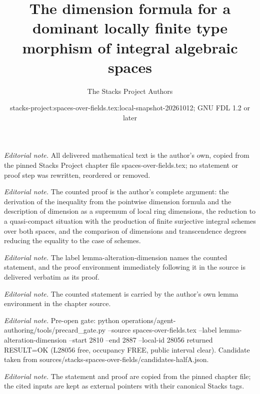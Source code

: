 \documentclass[10pt,a4paper]{amsart}
\title{The dimension formula for a dominant locally finite type morphism of integral algebraic spaces}
\author{The Stacks Project Authors}
\date{stacks-project:spaces-over-fields.tex:local-snapshot-20261012; GNU FDL 1.2 or later}
\theoremstyle{plain}
\theoremstyle{definition}
\theoremstyle{remark}
\numberwithin{equation}{subsection}
\begin{document}
\maketitle
\noindent\textit{Editorial note.} All delivered mathematical text is the author's own, copied from the pinned Stacks Project chapter file spaces-over-fields.tex; no statement or proof step was rewritten, reordered or removed.\par\medskip
\noindent\textit{Editorial note.} The counted proof is the author's complete argument: the derivation of the inequality from the pointwise dimension formula and the description of dimension as a supremum of local ring dimensions, the reduction to a quasi-compact situation with the production of finite surjective integral schemes over both spaces, and the comparison of dimensions and transcendence degrees reducing the equality to the case of schemes.\par\medskip
\noindent\textit{Editorial note.} The label lemma-alteration-dimension names the counted statement, and the proof environment immediately following it in the source is delivered verbatim as its proof.\par\medskip
\noindent\textit{Editorial note.} The counted statement is carried by the author's own lemma environment in the chapter source.\par\medskip
\noindent\textit{Editorial note.} Pre-open gate: python operations/agent-authoring/tools/precard\_gate.py --source spaces-over-fields.tex --label lemma-alteration-dimension --start 2810 --end 2887 --local-id 28056 returned RESULT=OK (L28056 free, occupancy FREE, public interval clear). Candidate taken from sources/stacks-spaces-over-fields/candidates-halfA.json.\par\medskip
\noindent\textit{Editorial note.} The statement and proof are copied from the pinned chapter file; the cited inputs are kept as external pointers with their canonical Stacks tags.\par\medskip
\end{document}

